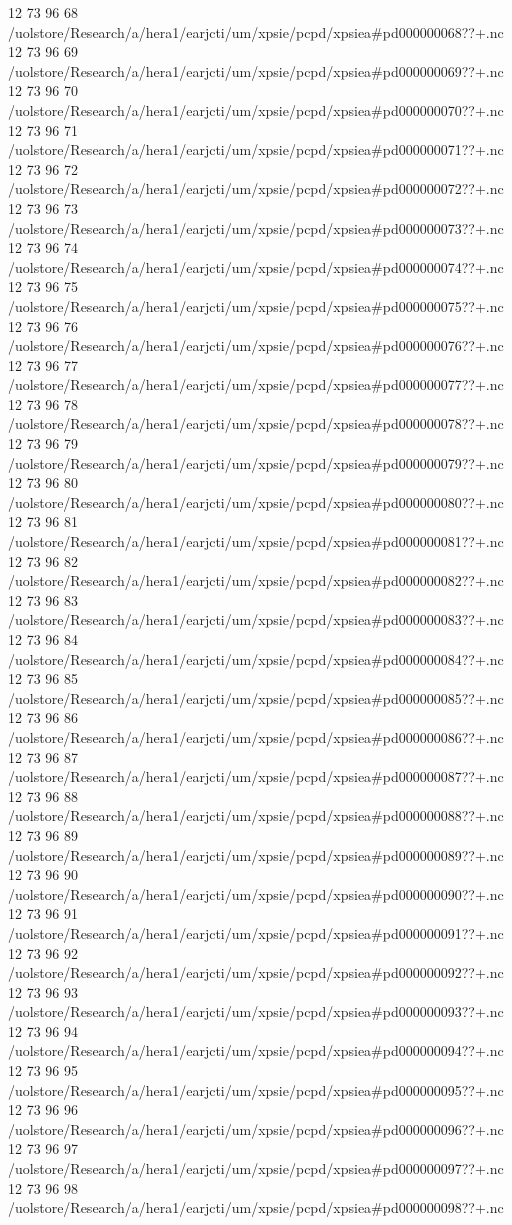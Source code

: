 12 73 96
68
/uolstore/Research/a/hera1/earjcti/um/xpsie/pcpd/xpsiea#pd000000068??+.nc
12 73 96
69
/uolstore/Research/a/hera1/earjcti/um/xpsie/pcpd/xpsiea#pd000000069??+.nc
12 73 96
70
/uolstore/Research/a/hera1/earjcti/um/xpsie/pcpd/xpsiea#pd000000070??+.nc
12 73 96
71
/uolstore/Research/a/hera1/earjcti/um/xpsie/pcpd/xpsiea#pd000000071??+.nc
12 73 96
72
/uolstore/Research/a/hera1/earjcti/um/xpsie/pcpd/xpsiea#pd000000072??+.nc
12 73 96
73
/uolstore/Research/a/hera1/earjcti/um/xpsie/pcpd/xpsiea#pd000000073??+.nc
12 73 96
74
/uolstore/Research/a/hera1/earjcti/um/xpsie/pcpd/xpsiea#pd000000074??+.nc
12 73 96
75
/uolstore/Research/a/hera1/earjcti/um/xpsie/pcpd/xpsiea#pd000000075??+.nc
12 73 96
76
/uolstore/Research/a/hera1/earjcti/um/xpsie/pcpd/xpsiea#pd000000076??+.nc
12 73 96
77
/uolstore/Research/a/hera1/earjcti/um/xpsie/pcpd/xpsiea#pd000000077??+.nc
12 73 96
78
/uolstore/Research/a/hera1/earjcti/um/xpsie/pcpd/xpsiea#pd000000078??+.nc
12 73 96
79
/uolstore/Research/a/hera1/earjcti/um/xpsie/pcpd/xpsiea#pd000000079??+.nc
12 73 96
80
/uolstore/Research/a/hera1/earjcti/um/xpsie/pcpd/xpsiea#pd000000080??+.nc
12 73 96
81
/uolstore/Research/a/hera1/earjcti/um/xpsie/pcpd/xpsiea#pd000000081??+.nc
12 73 96
82
/uolstore/Research/a/hera1/earjcti/um/xpsie/pcpd/xpsiea#pd000000082??+.nc
12 73 96
83
/uolstore/Research/a/hera1/earjcti/um/xpsie/pcpd/xpsiea#pd000000083??+.nc
12 73 96
84
/uolstore/Research/a/hera1/earjcti/um/xpsie/pcpd/xpsiea#pd000000084??+.nc
12 73 96
85
/uolstore/Research/a/hera1/earjcti/um/xpsie/pcpd/xpsiea#pd000000085??+.nc
12 73 96
86
/uolstore/Research/a/hera1/earjcti/um/xpsie/pcpd/xpsiea#pd000000086??+.nc
12 73 96
87
/uolstore/Research/a/hera1/earjcti/um/xpsie/pcpd/xpsiea#pd000000087??+.nc
12 73 96
88
/uolstore/Research/a/hera1/earjcti/um/xpsie/pcpd/xpsiea#pd000000088??+.nc
12 73 96
89
/uolstore/Research/a/hera1/earjcti/um/xpsie/pcpd/xpsiea#pd000000089??+.nc
12 73 96
90
/uolstore/Research/a/hera1/earjcti/um/xpsie/pcpd/xpsiea#pd000000090??+.nc
12 73 96
91
/uolstore/Research/a/hera1/earjcti/um/xpsie/pcpd/xpsiea#pd000000091??+.nc
12 73 96
92
/uolstore/Research/a/hera1/earjcti/um/xpsie/pcpd/xpsiea#pd000000092??+.nc
12 73 96
93
/uolstore/Research/a/hera1/earjcti/um/xpsie/pcpd/xpsiea#pd000000093??+.nc
12 73 96
94
/uolstore/Research/a/hera1/earjcti/um/xpsie/pcpd/xpsiea#pd000000094??+.nc
12 73 96
95
/uolstore/Research/a/hera1/earjcti/um/xpsie/pcpd/xpsiea#pd000000095??+.nc
12 73 96
96
/uolstore/Research/a/hera1/earjcti/um/xpsie/pcpd/xpsiea#pd000000096??+.nc
12 73 96
97
/uolstore/Research/a/hera1/earjcti/um/xpsie/pcpd/xpsiea#pd000000097??+.nc
12 73 96
98
/uolstore/Research/a/hera1/earjcti/um/xpsie/pcpd/xpsiea#pd000000098??+.nc
